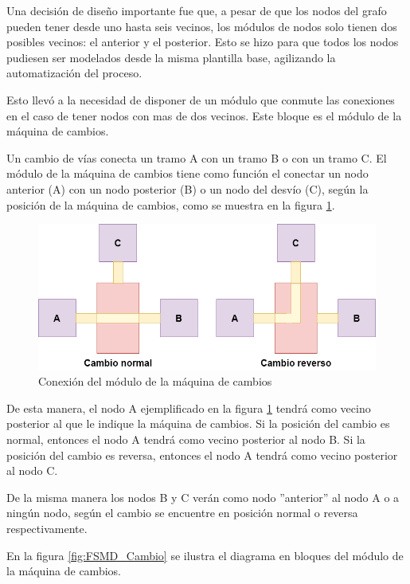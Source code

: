 	Una decisión de diseño importante fue que, a pesar de que los nodos del grafo pueden tener desde uno hasta seis vecinos, los módulos de nodos solo tienen dos posibles vecinos: el anterior y el posterior. Esto se hizo para que todos los nodos pudiesen ser modelados desde la misma plantilla base, agilizando la automatización del proceso.
	
	Esto llevó a la necesidad de disponer de un módulo que conmute las conexiones en el caso de tener nodos con mas de dos vecinos. Este bloque es el módulo de la máquina de cambios.
	
	Un cambio de vías conecta un tramo A con un tramo B o con un tramo C. El módulo de la máquina de cambios tiene como función el conectar un nodo anterior (A) con un nodo posterior (B) o un nodo del desvío (C), según la posición de la máquina de cambios, como se muestra en la figura \ref{fig:Cambio_conexion}.
	
	\begin{figure}[h]
	\centering
	\includegraphics[scale=.5]{./Figures/FSMD-Conexiones}
		\caption{Conexión del módulo de la máquina de cambios}
		\label{fig:Cambio_conexion}
	\end{figure}	
	
	De esta manera, el nodo A ejemplificado en la figura \ref{fig:Cambio_conexion} tendrá como vecino posterior al que le indique la máquina de cambios. Si la posición del cambio es normal, entonces el nodo A tendrá como vecino posterior al nodo B. Si la posición del cambio es reversa, entonces el nodo A tendrá como vecino posterior al nodo C.
	
	De la misma manera los nodos B y C verán como nodo ''anterior'' al nodo A o a ningún nodo, según el cambio se encuentre en posición normal o reversa respectivamente.	
	
	En la figura \ref{fig:FSMD_Cambio} se ilustra el diagrama en bloques del módulo de la máquina de cambios.
	
